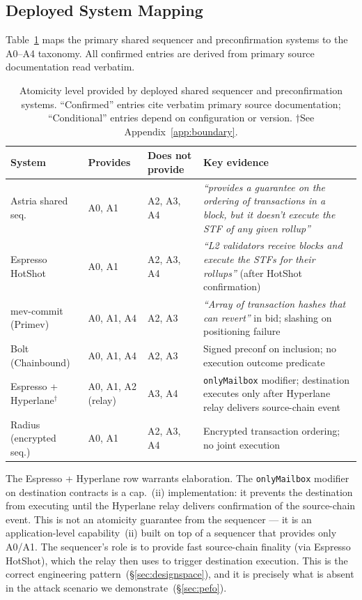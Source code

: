 \subsection{Deployed System Mapping}
\label{sec:mapping}

Table~\ref{tab:mapping} maps the primary shared sequencer and
preconfirmation systems to the A0--A4 taxonomy. All confirmed entries
are derived from primary source documentation read verbatim.

\begin{table}[h]
\centering
\small
\caption{Atomicity level provided by deployed shared sequencer and
  preconfirmation systems. ``Confirmed'' entries cite verbatim primary
  source documentation; ``Conditional'' entries depend on configuration
  or version. $\dagger$See Appendix~\ref{app:boundary}.}
\label{tab:mapping}
\begin{tabular}{@{}lllp{4.5cm}@{}}
\toprule
System & Provides & Does not provide & Key evidence \\
\midrule
Astria shared seq. & A0, A1 & A2, A3, A4 &
  \emph{``provides a guarantee on the ordering of transactions in a
  block, but it doesn't execute the STF of any given rollup''}~\cite{Astria-TxFlow}\\
Espresso HotShot & A0, A1 & A2, A3, A4 &
  \emph{``L2 validators receive blocks and execute the STFs for their
  rollups''} (after HotShot confirmation)~\cite{Espresso-Architecture} \\
mev-commit (Primev) & A0, A1, A4 & A2, A3 &
  \emph{``Array of transaction hashes that can revert''} in bid;
  slashing on positioning failure~\cite{MevCommit-Docs} \\
Bolt (Chainbound) & A0, A1, A4 & A2, A3 &
  Signed preconf on inclusion; no execution outcome
  predicate~\cite{Bolt-Docs} \\
Espresso + Hyperlane$^\dagger$ & A0, A1, A2 (relay) & A3, A4 &
  \texttt{onlyMailbox} modifier; destination executes only after
  Hyperlane relay delivers source-chain
  event~\cite{Espresso-Presto} \\
Radius (encrypted seq.) & A0, A1 & A2, A3, A4 &
  Encrypted transaction ordering; no joint
  execution~\cite{Radius-Docs} \\
\bottomrule
\end{tabular}
\end{table}

\noindent The Espresso + Hyperlane row warrants elaboration. The
\texttt{onlyMailbox} modifier on destination contracts is a cap.~(ii)
implementation: it prevents the destination from executing until the
Hyperlane relay delivers confirmation of the source-chain event. This
is not an atomicity guarantee from the sequencer --- it is an
application-level capability~(ii) built on top of a sequencer that
provides only A0/A1. The sequencer's role is to provide fast
source-chain finality (via Espresso HotShot), which the relay then
uses to trigger destination execution. This is the correct engineering
pattern~(\S\ref{sec:designspace}), and it is precisely what is absent in
the attack scenario we demonstrate~(\S\ref{sec:pefo}).

